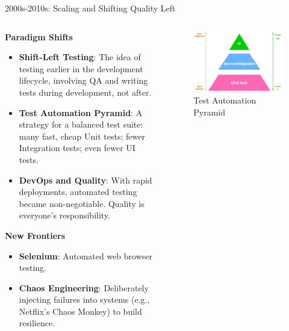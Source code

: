 \documentclass{beamer}
\begin{document}
\begin{frame}[t]{2000s-2010s: Scaling and Shifting Quality Left}
\begin{columns}
    \begin{column}{0.45\textwidth}
        \textbf{Paradigm Shifts}
        \scriptsize
        \begin{itemize}
            \item \textbf{Shift-Left Testing}: The idea of testing earlier in the development lifecycle, involving QA and writing tests during development, not after.
            \item \textbf{Test Automation Pyramid}: A strategy for a balanced test suite: many fast, cheap Unit tests; fewer Integration tests; even fewer UI tests.
            \item \textbf{DevOps and Quality}: With rapid deployments, automated testing became non-negotiable. Quality is everyone's responsibility.
        \end{itemize}
        \normalsize
        \textbf{New Frontiers}
        \scriptsize
        \begin{itemize}
            \item \textbf{Selenium}: Automated web browser testing.
            \item \textbf{Chaos Engineering}: Deliberately injecting failures into systems (e.g., Netflix's Chaos Monkey) to build resilience.
        \end{itemize}
    \end{column}
    \begin{column}{0.45\textwidth}
        \begin{figure}
        \begin{center}
            \includegraphics[width=\textwidth]{images/test-pyramid.png}
        \end{center}
        \caption{Test Automation Pyramid}
        \label{fig:}
        \end{figure}
        
    \end{column}
\end{columns}
\end{frame}
\end{document}
